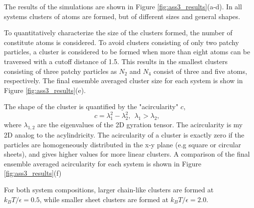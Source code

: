 \documentclass[10pt,a4paper]{labreport}
\begin{document}
The results of the simulations are shown in Figure \ref{fig:ass3_results}(a-d). 
In all systems clusters of atoms are formed, but of different sizes and general shapes. 

To quantitatively characterize the size of the clusters formed, the number of constitute atoms is considered. 
To avoid clusters consisting of only two patchy particles, a cluster is considered to be formed when more than eight atoms can be traversed with a cutoff distance of 1.5. 
This results in the smallest clusters consisting of three patchy particles as $N_2$ and $N_4$ consist of three and five atoms, respectively. The final ensemble averaged cluster size for each system is show in Figure \ref{fig:ass3_results}(e).

The shape of the cluster is quantified by the "acircularity" $c$,
\begin{equation}
  c = \lambda_1 ^2 - \lambda_2^2,~~ \lambda_1 > \lambda_2,
\end{equation}
where $\lambda_{1,2}$ are the eigenvalues of the 2D gyration tensor. 
The acircularity is my 2D analog to the acylindricity. 
The acircularity of a cluster is exactly zero if the particles are homogeneously distributed in the x-y plane (e.g square or circular sheets), and gives higher values for more linear clusters. A comparison of the final ensemble averaged acircularity for each system is shown in Figure \ref{fig:ass3_results}(f)

For both system compositions, larger chain-like clusters are formed at $k_BT / \epsilon = 0.5$, while smaller sheet clusters are formed at  $k_BT / \epsilon = 2.0$. 
\end{document}
